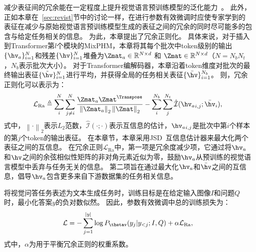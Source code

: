 
减少表征间的冗余能在一定程度上提升视觉语言预训练模型的泛化能力~\cite{jiang2022finetuning}。
此外，正如本章在~\ref{sec:revist}节中的讨论一样，在进行参数有效微调时应使专家学到的表征在减少与原始视觉语言预训练模型生成的表征之间的冗余的同时尽可能多的包含与给定任务相关的信息。
为此，本章提出了冗余正则化。
具体来说，对于插入到Transformer第$l$个模块的MixPHM，本章将其每个批次中token级别的输出$\{\hv_a\}_{i=1}^{N}$和残差$\{\hv\}_{i=1}^{N}$堆叠为$\Zmat_a \in \mathbb{R}^{N \times d}$ 和 $\Zmat \in \mathbb{R}^{N \times d}$（$N=N_bN_t$，$N_b$表示批次大小）。
对于Transformer编解码器，本章沿着token维度对批次的最终输出表征$\{\tilde{\hv}\}_{i=1}^{N}$进行平均，并获得全局的任务相关表征$\{\bar{\hv} \}_{i=1}^{N_b}$。
则，冗余正则化可以表示为：
\begin{equation}
\mathcal{L}_{\text{Ra}} \triangleq \sum_i^N \sum_{j \neq i}^N \frac{\Zmat_a \Zmat^{\Transpose}}{\left\|\Zmat_a\right\|_2 \left\|\Zmat\right\|_2} - \sum_i^{N_b}\sum_j^{N_t} \hat{\mathcal{I}}({\hv_{a}}_{i,j}; \bar{\hv}_{i}),
\label{eq:L_Ra} 
\end{equation} 
式中，$\left\|\cdot\right\|_2$表示$L_2$范数，$\hat{\mathcal{I}}(\cdot;\cdot)$表示互信息的估计，${\hv_{a}}_{i,j}$是批次中第$i$个样本的第$j$个token的输出表征。
在本章节，本章采用JSD~\cite{hjelm2019learning}互信息估计器来最大化两个表征之间的互信息。
在冗余正则$\mathcal{L}_{\text{Ra}}$中，第一项是冗余度减少项，它通过将$\hv_a$和$\hv$之间的余弦相似性矩阵的非对角元素近似为零，鼓励$\hv_a$从预训练的视觉语言模型中丢弃与任务无关的信息。
第二项旨在通过最大化$\hv_a$和$\bar{\hv}$之间的互信息，倡导$\hv_a$包含更多来自下游数据集的任务相关信息。

将视觉问答任务表述为文本生成任务时，训练目标是在给定输入图像$I$和问题$Q$时，最小化答案$y$的负对数似然。
因此，参数有效微调中总的训练损失为：
\begin{equation}
\begin{aligned}
\mathcal{L} = -\sum_{j=1}^{|y|}\log P_{\thetav}(y_j|y_{<j}; I, Q) + \alpha \mathcal{L}_{\text{Ra}}, 
\label{eq:L_total}
\end{aligned}
\end{equation} 
式中，$\alpha$为用于平衡冗余正则的权重系数。



